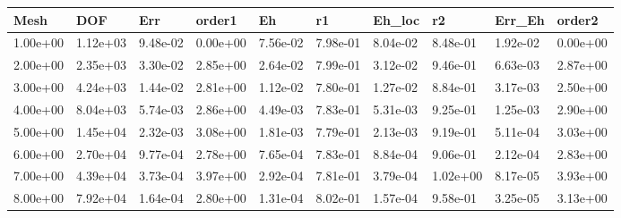 \begin{tabular}{llllllllll}
Mesh & DOF & Err & order1 & Eh & r1 & Eh_loc & r2 & Err_Eh & order2 \\ 
\hline 
1.00e+00 & 1.12e+03 & 9.48e-02 & 0.00e+00 & 7.56e-02 & 7.98e-01 & 8.04e-02 & 8.48e-01 & 1.92e-02 & 0.00e+00 \\ 
2.00e+00 & 2.35e+03 & 3.30e-02 & 2.85e+00 & 2.64e-02 & 7.99e-01 & 3.12e-02 & 9.46e-01 & 6.63e-03 & 2.87e+00 \\ 
3.00e+00 & 4.24e+03 & 1.44e-02 & 2.81e+00 & 1.12e-02 & 7.80e-01 & 1.27e-02 & 8.84e-01 & 3.17e-03 & 2.50e+00 \\ 
4.00e+00 & 8.04e+03 & 5.74e-03 & 2.86e+00 & 4.49e-03 & 7.83e-01 & 5.31e-03 & 9.25e-01 & 1.25e-03 & 2.90e+00 \\ 
5.00e+00 & 1.45e+04 & 2.32e-03 & 3.08e+00 & 1.81e-03 & 7.79e-01 & 2.13e-03 & 9.19e-01 & 5.11e-04 & 3.03e+00 \\ 
6.00e+00 & 2.70e+04 & 9.77e-04 & 2.78e+00 & 7.65e-04 & 7.83e-01 & 8.84e-04 & 9.06e-01 & 2.12e-04 & 2.83e+00 \\ 
7.00e+00 & 4.39e+04 & 3.73e-04 & 3.97e+00 & 2.92e-04 & 7.81e-01 & 3.79e-04 & 1.02e+00 & 8.17e-05 & 3.93e+00 \\ 
8.00e+00 & 7.92e+04 & 1.64e-04 & 2.80e+00 & 1.31e-04 & 8.02e-01 & 1.57e-04 & 9.58e-01 & 3.25e-05 & 3.13e+00 \\ 
\hline 
\end{tabular}